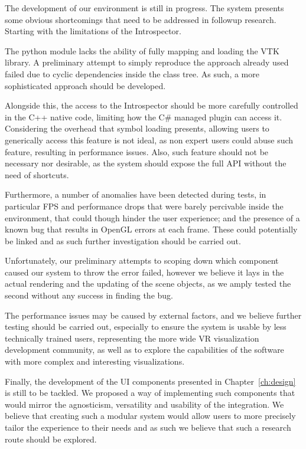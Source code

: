 The development of our environment is still in progress. The system presents some obvious shortcomings that need to be addressed in followup research. Starting with the limitations of the Introspector.

The python module lacks the ability of fully mapping and loading the VTK library. A preliminary attempt to simply reproduce the approach \cite{dreuning_visual_2016} already used failed due to cyclic dependencies inside the class tree. As such, a more sophisticated approach should be developed.

Alongside this, the access to the Introspector should be more carefully controlled in the C++ native code, limiting how the C\# managed plugin can access it. Considering the overhead that symbol loading presents, allowing users to generically access this feature is not ideal, as non expert users could abuse such feature, resulting in performance issues. Also, such feature should not be necessary nor desirable, as the system should expose the full API without the need of shortcuts.

Furthermore, a number of anomalies have been detected during tests, in particular FPS and performance drops that were barely percivable inside the environment, that could though hinder the user experience; and the presence of a known bug that results in OpenGL errors at each frame. These could potentially be linked and as such further investigation should be carried out.

Unfortunately, our preliminary attempts to scoping down which component caused our system to throw the error failed, however we believe it lays in the actual rendering and the updating of the scene objects, as we amply tested the second without any success in finding the bug.

The performance issues may be caused by external factors, and we believe further testing should be carried out, especially to ensure the system is usable by less technically trained users, representing the more wide VR visualization development community, as well as to explore the capabilities of the software with more complex and interesting visualizations.

Finally, the development of the UI components presented in Chapter~\ref{ch:design} is still to be tackled. We proposed a way of implementing such components that would mirror the agnosticism, versatility and usability of the integration. We believe that creating such a modular system would allow users to more precisely tailor the experience to their needs and as such we believe that such a research route should be explored.
